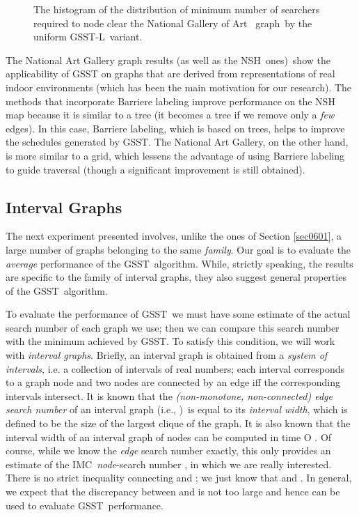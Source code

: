 \documentclass[11pt]{article}\usepackage{amsmath}
\begin{document}
\begin{figure}[h]
\centering{}\caption{The
histogram of the distribution of minimum number of searchers required to node
clear the National Gallery of Art \ graph\ by the uniform GSST-L\ variant.}\label{fig14}\end{figure}

The National Art Gallery graph results (as well as the NSH\ ones)\ show the
applicability of GSST on graphs that are derived from representations of real
indoor environments (which has been the main motivation for our research). The
methods that incorporate Barriere labeling improve performance on the NSH map
because it is similar to a tree (it becomes a tree if we remove only a
\emph{few} edges). In this case, Barriere labeling, which is based on trees,
helps to improve the schedules generated by GSST. The National Art Gallery, on
the other hand, is more similar to a grid, which lessens the advantage of
using Barriere labeling to guide traversal (though a significant improvement
is still obtained).

\subsection{Interval Graphs}

\label{sec0602}

The next experiment presented involves, unlike the ones of Section
\ref{sec0601}, a large number of graphs belonging to the same \emph{family}.
Our goal is to evaluate the \emph{average }performance of the GSST\ algorithm.
While, strictly speaking, the results are specific to the family of interval
graphs, they also suggest general properties of the GSST\ algorithm.

To evaluate the performance of GSST\ we must have some estimate of the actual
search number of each graph we use; then we can compare this search number
with the minimum  achieved by GSST.
To satisfy this condition, we will work with \emph{interval graphs}. Briefly,
an interval graph is obtained from a \emph{system of intervals}, i.e. a
collection of intervals of real numbers; each interval corresponds to a graph
node and two nodes are connected by an edge iff the corresponding intervals
intersect. It is known \cite{IntervalFomin,IntervalKaplan} that the
\emph{(non-monotone, non-connected) edge search number} of an interval graph
 (i.e., )\ is equal to its
\emph{interval width}, which is defined to be the size of the largest clique
of the graph. It is also known that the interval width of an interval graph
 of  nodes can be computed in time O
\cite{IntervalFomin,IntervalKaplan}. Of course, while we know the \emph{edge}
search number  exactly, this only provides
an estimate of the IMC\ \emph{node}-search number , in which we are really interested. There is no strict
inequality connecting  and ; we just know that  and . In general,
we expect that the discrepancy between  and
 is not too large and hence
 can be used to evaluate GSST\ performance.
\end{document}
